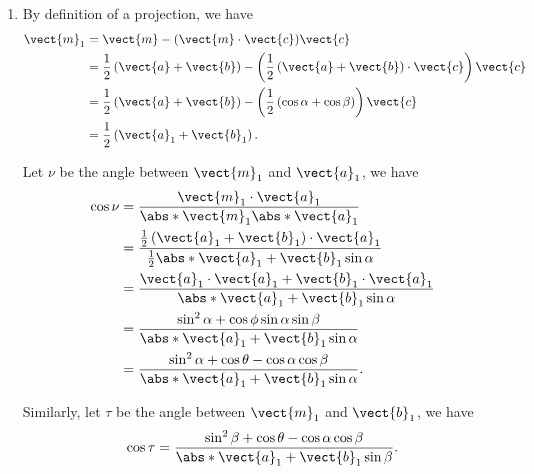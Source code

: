 \begin{enumerate}
    \item By definition of a projection, we have
          \begin{align*}
              \vect{m}_1 & = \vect{m} - (\vect{m} \cdot \vect{c}) \vect{c}                                                                                    \\
                         & = \frac{1}{2} \left(\vect{a} + \vect{b}\right) - \left(\frac{1}{2} \left(\vect{a} + \vect{b}\right) \cdot \vect{c}\right) \vect{c} \\
                         & = \frac{1}{2} \left(\vect{a} + \vect{b}\right) - \left(\frac{1}{2} \left(\cos \alpha + \cos \beta\right)\right) \vect{c}           \\
                         & = \frac{1}{2} \left(\vect{a}_1 + \vect{b}_1\right).
          \end{align*}

          Let \(\nu\) be the angle between \(\vect{m}_1\) and \(\vect{a}_1\), we have
          \begin{align*}
              \cos \nu & = \frac{\vect{m}_1 \cdot \vect{a}_1}{\abs*{\vect{m}_1} \abs*{\vect{a}_1}}                                                          \\
                       & = \frac{\frac{1}{2} \left(\vect{a}_1 + \vect{b}_1\right) \cdot \vect{a}_1}{\frac{1}{2} \abs*{\vect{a}_1 + \vect{b}_1} \sin \alpha} \\
                       & = \frac{\vect{a}_1 \cdot \vect{a}_1 + \vect{b}_1 \cdot \vect{a}_1}{\abs*{\vect{a}_1 + \vect{b}_1} \sin \alpha}                     \\
                       & = \frac{\sin^2 \alpha + \cos \phi \sin \alpha \sin \beta}{\abs*{\vect{a}_1 + \vect{b}_1} \sin \alpha}                              \\
                       & = \frac{\sin^2 \alpha + \cos \theta - \cos \alpha \cos \beta}{\abs*{\vect{a}_1 + \vect{b}_1} \sin \alpha}.
          \end{align*}

          Similarly, let \(\tau\) be the angle between \(\vect{m}_1\) and \(\vect{b}_1\), we have
          \[
              \cos \tau = \frac{\sin^2 \beta + \cos \theta - \cos \alpha \cos \beta}{\abs*{\vect{a}_1 + \vect{b}_1} \sin \beta}.
          \]


\end{enumerate}
